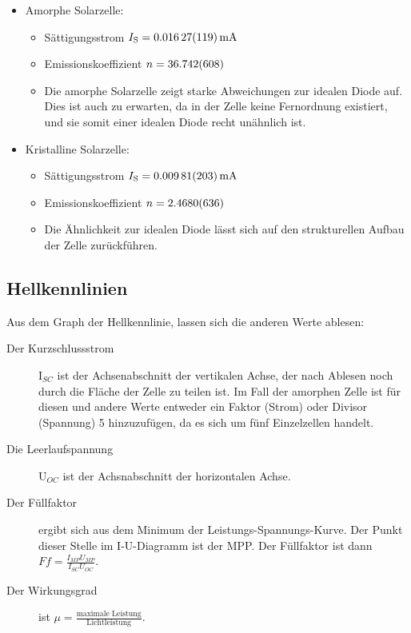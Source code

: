 \documentclass[12pt,a4paper,ngerman]{report}
\begin{document}
		\begin{samepage}
		\begin{itemize}
			\item Amorphe Solarzelle:
				\begin{itemize}
					\item Sättigungsstrom $I_\text{S} = \SI{0,01627+-0,00119}{\milli\ampere}$
					\item Emissionskoeffizient $n = \num{36,742 +- 0,608}$\\
					\item Die amorphe Solarzelle zeigt starke Abweichungen
zur idealen Diode auf. Dies ist auch zu erwarten, da in der Zelle keine Fernordnung
existiert, und sie somit einer idealen Diode recht unähnlich ist.
				\end{itemize}
			\item Kristalline Solarzelle:
				\begin{itemize}
					\item Sättigungsstrom $I_\text{S} = \SI{0,00981+-0,00203}{\milli\ampere}$
					\item Emissionskoeffizient $n = \num{2,468 +- 0,0636}$
					\item Die Ähnlichkeit zur idealen Diode lässt sich
auf den strukturellen Aufbau der Zelle zurückführen.
				\end{itemize}
		\end{itemize}
		\end{samepage}

	\subsection{Hellkennlinien}

		Aus dem Graph der Hellkennlinie, lassen sich die anderen Werte ablesen:
		
		\begin{description}
		\item[Der Kurzschlussstrom] I$_{SC}$ ist der Achsenabschnitt der vertikalen Achse, der nach Ablesen noch durch die Fläche der Zelle zu teilen ist. Im Fall der amorphen Zelle ist für diesen und andere Werte entweder ein Faktor (Strom) oder Divisor (Spannung) 5 hinzuzufügen, da es sich um fünf Einzelzellen handelt.
		\item[Die Leerlaufspannung] U$_{OC}$ ist der Achsnabschnitt der horizontalen Achse.
		\item[Der Füllfaktor] ergibt sich aus dem Minimum der Leistungs-Spannungs-Kurve. Der Punkt dieser Stelle im I-U-Diagramm ist der MPP. Der Füllfaktor ist dann $Ff=\frac{I_{MP}U_{MP}}{I_{SC}U_{OC}}$.
		\item[Der Wirkungsgrad] ist $\mu=\frac{\text{maximale Leistung}}{\text{Lichtleistung}}$.
		\end{description}
		
\end{document}
